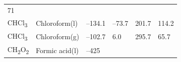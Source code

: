 \documentclass[
]{book}
\theoremstyle{definition}
\theoremstyle{definition}
\theoremstyle{definition}
\theoremstyle{remark}
\begin{document}
\begin{longtable}[]{@{}llllll@{}}
\begin{minipage}[t]{0.14\columnwidth}
71\strut
\end{minipage}\tabularnewline
\begin{minipage}[t]{0.07\columnwidth}\raggedright
CHCl\textsubscript{3}\strut
\end{minipage} & \begin{minipage}[t]{0.17\columnwidth}\raggedright
Chloroform(l)\strut
\end{minipage} & \begin{minipage}[t]{0.15\columnwidth}\raggedright
--134.1\strut
\end{minipage} & \begin{minipage}[t]{0.15\columnwidth}\raggedright
--73.7\strut
\end{minipage} & \begin{minipage}[t]{0.14\columnwidth}\raggedright
201.7\strut
\end{minipage} & \begin{minipage}[t]{0.14\columnwidth}\raggedright
114.2\strut
\end{minipage}\tabularnewline
\begin{minipage}[t]{0.07\columnwidth}\raggedright
CHCl\textsubscript{3}\strut
\end{minipage} & \begin{minipage}[t]{0.17\columnwidth}\raggedright
Chloroform(g)\strut
\end{minipage} & \begin{minipage}[t]{0.15\columnwidth}\raggedright
--102.7\strut
\end{minipage} & \begin{minipage}[t]{0.15\columnwidth}\raggedright
6.0\strut
\end{minipage} & \begin{minipage}[t]{0.14\columnwidth}\raggedright
295.7\strut
\end{minipage} & \begin{minipage}[t]{0.14\columnwidth}\raggedright
65.7\strut
\end{minipage}\tabularnewline
\begin{minipage}[t]{0.07\columnwidth}\raggedright
CH\textsubscript{2}O\textsubscript{2}\strut
\end{minipage} & \begin{minipage}[t]{0.17\columnwidth}\raggedright
Formic acid(l)\strut
\end{minipage} & \begin{minipage}[t]{0.15\columnwidth}\raggedright
--425\strut
\end{minipage} & \begin{minipage}[t]{0.15\columnwidth}\raggedright

\end{minipage}
\end{longtable}
\end{document}
